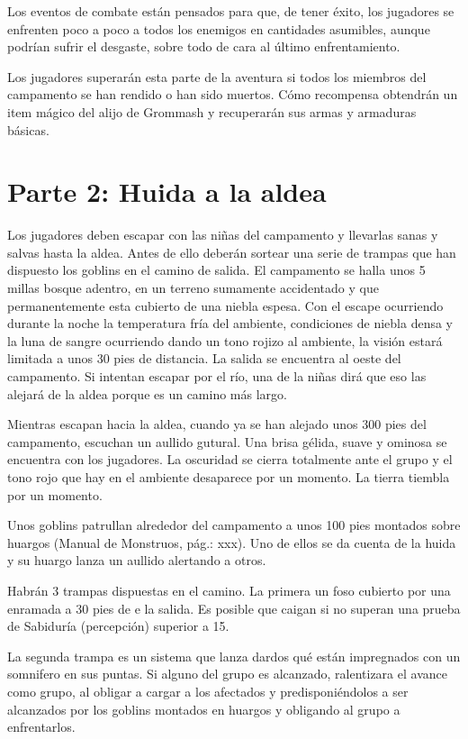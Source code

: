 \documentclass[10pt,twoside,twocolumn,openany]{dndbook}
\begin{document}
Los eventos de combate están pensados para que, de tener éxito, los jugadores se enfrenten poco a poco 
a todos los enemigos en cantidades asumibles, aunque podrían sufrir el desgaste, sobre todo de cara al 
último enfrentamiento.

Los jugadores superarán esta parte de la aventura si todos los miembros del campamento se han rendido 
o han sido muertos. Cómo recompensa obtendrán un item mágico del alijo de Grommash y recuperarán sus 
armas y armaduras básicas.


\section{Parte 2: Huida a la aldea}

Los jugadores deben escapar con las niñas del campamento y llevarlas sanas y salvas hasta la aldea. 
Antes de ello deberán sortear una serie de trampas que han dispuesto los goblins en el camino de salida. 
El campamento se halla unos 5 millas bosque adentro, en un terreno sumamente accidentado y que 
permanentemente esta cubierto de una niebla espesa. Con el escape ocurriendo durante la noche 
la temperatura fría del ambiente, condiciones de niebla densa y la luna de sangre ocurriendo dando 
un tono rojizo al ambiente, la visión estará limitada a unos 30 pies de distancia. La salida se 
encuentra al oeste del campamento. Si intentan escapar por el río, una de la niñas dirá que eso 
las alejará de la aldea porque es un camino más largo.

\begin{DndReadAloud}
Mientras escapan hacia la aldea, cuando ya se han alejado unos 300 pies del campamento, escuchan 
un aullido gutural. Una brisa gélida, suave y ominosa se encuentra con los jugadores. La oscuridad
se cierra totalmente ante el grupo y el tono rojo que hay en el ambiente desaparece por un momento.
La tierra tiembla por un momento.
\end{DndReadAloud}

Unos goblins patrullan alrededor del campamento a unos 100 pies montados sobre huargos (Manual 
de Monstruos, pág.: xxx). Uno de ellos se da cuenta de la huida y su huargo lanza un aullido 
alertando a otros.

Habrán 3 trampas dispuestas en el camino. La primera un foso cubierto por una enramada a 30 pies de e
la salida. Es posible que caigan si no superan una prueba de Sabiduría (percepción) superior a 15.

La segunda trampa es un sistema que lanza dardos qué están impregnados con un somnifero en sus puntas. 
Si alguno del grupo es alcanzado, ralentizara el avance como grupo, al obligar a cargar a los afectados 
y predisponiéndolos a ser alcanzados por los goblins montados en huargos y obligando al grupo a 
enfrentarlos.
\end{document}
